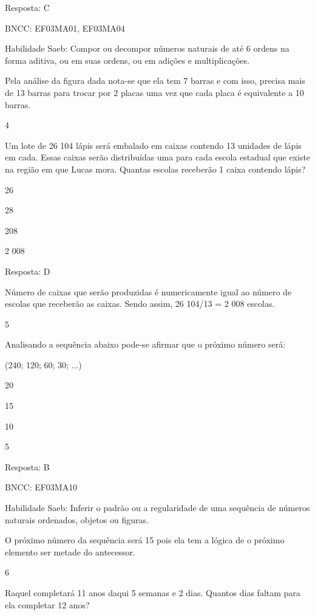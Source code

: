 \begin{escolha}
Resposta: C

BNCC: EF03MA01, EF03MA04

Habilidade Saeb: Compor ou decompor números naturais de até 6 ordens na
forma aditiva, ou em suas ordens, ou em adições e multiplicações.

Pela análise da figura dada nota-se que ela tem 7 barras e com isso,
precisa mais de 13 barras para trocar por 2 placas uma vez que cada
placa é equivalente a 10 barras.

\num{4}

Um lote de 26 104 lápis será embalado em caixas contendo 13 unidades de
lápis em cada. Essas caixas serão distribuídas uma para cada escola
estadual que existe na região em que Lucas mora. Quantas escolas
receberão 1 caixa contendo lápis?

\begin{escolha}
\item
  26
\item
  28
\item
  208
\item
  2 008
\end{escolha}

Resposta: D

Número de caixas que serão produzidas é numericamente igual ao número de
escolas que receberão as caixas. Sendo assim, 26 104/13 = 2 008 escolas.

\num{5}

Analisando a sequência abaixo pode-se afirmar que o próximo número será:

(240; 120; 60; 30; ...)

\begin{escolha}
\item
  20
\item
  15
\item
  10
\item
  5
\end{escolha}

Resposta: B

BNCC: EF03MA10

Habilidade Saeb: Inferir o padrão ou a regularidade de uma sequência de
números naturais ordenados, objetos ou figuras.

O próximo número da sequência será 15 pois ela tem a lógica de o próximo
elemento ser metade do antecessor.

\num{6}

Raquel completará 11 anos daqui 5 semanas e 2 dias. Quantos dias faltam
para ela completar 12 anos?


\end{escolha}
